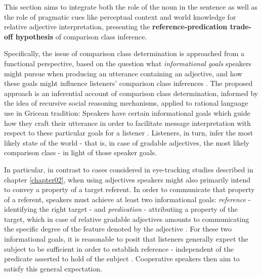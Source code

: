This section aims to integrate both the role of the noun in the sentence as well as the role of pragmatic cues like perceptual context and world knowledge for relative adjective interpretation, presenting the \textbf{reference-predication trade-off hypothesis} of comparison class inference. 

Specifically, the issue of comparison class determination is approached from a functional perspective, based on the question what \emph{informational goals} speakers might pursue when producing an utterance containing an adjective, and how these goals might influence listeners’ comparison class inferences \parencite{tessler2020}.
The proposed approach is an inferential account of comparison class determination, informed by the idea of recursive social reasoning mechanisms, applied to rational language use in Gricean tradition: Speakers have certain informational goals which guide how they craft their utterance in order to facilitate message interpretation with respect to these particular goals for a listener \parencite{goodman2016}. Listeners, in turn, infer the most likely state of the world - that is, in case of gradable adjectives, the most likely comparison class - in light of those speaker goals. 

In particular, in contrast to cases considered in eye-tracking studies described in chapter \ref{chapter02},  when using adjectives speakers might also primarily intend to convey a property of a target referent. In order to communicate that property of a referent, speakers must achieve at least two informational goals: \textit{reference} - identifying the right target - and \textit{predication} - attributing a property of the target, which in case of relative gradable adjectives amounts to communicating the specific degree of the feature denoted by the adjective \parencite{Reboul2001, Kennedy2007}.  
For these two informational goals, it is reasonable to posit that listeners generally expect the subject to be sufficient in order to establish reference - independent of the predicate asserted to hold of the subject \parencite{Reboul2001, syrett2010meaning, searle1969speech}. Cooperative speakers then aim to satisfy this general expectation.

